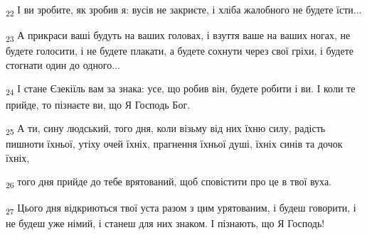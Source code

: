 \begin{tcolorbox}
\textsubscript{22} І ви зробите, як зробив я: вусів не закриєте, і хліба жалобного не будете їсти...
\end{tcolorbox}
\begin{tcolorbox}
\textsubscript{23} А прикраси ваші будуть на ваших головах, і взуття ваше на ваших ногах, не будете голосити, і не будете плакати, а будете сохнути через свої гріхи, і будете стогнати один до одного...
\end{tcolorbox}
\begin{tcolorbox}
\textsubscript{24} І стане Єзекіїль вам за знака: усе, що робив він, будете робити і ви. І коли те прийде, то пізнаєте ви, що Я Господь Бог.
\end{tcolorbox}
\begin{tcolorbox}
\textsubscript{25} А ти, сину людський, того дня, коли візьму від них їхню силу, радість пишноти їхньої, утіху очей їхніх, прагнення їхньої душі, їхніх синів та дочок їхніх,
\end{tcolorbox}
\begin{tcolorbox}
\textsubscript{26} того дня прийде до тебе врятований, щоб сповістити про це в твої вуха.
\end{tcolorbox}
\begin{tcolorbox}
\textsubscript{27} Цього дня відкриються твої уста разом з цим урятованим, і будеш говорити, і не будеш уже німий, і станеш для них знаком. І пізнають, що Я Господь!
\end{tcolorbox}
